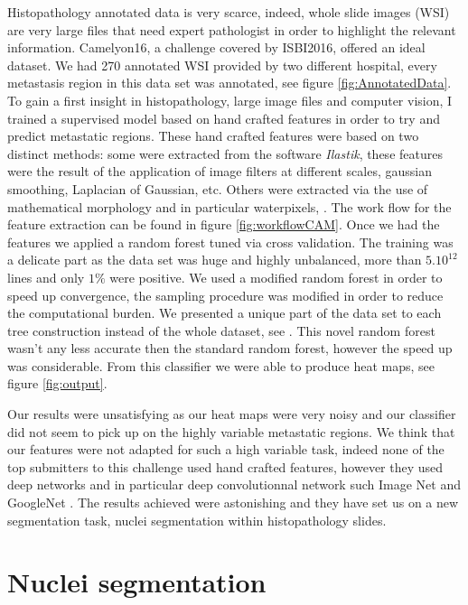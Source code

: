 \documentclass[a4paper,10pt,twocolumn]{article}
\begin{document}
Histopathology annotated data is very scarce, indeed, whole slide images (WSI) are very large files that need expert pathologist in order to highlight the relevant information. Camelyon16, a challenge covered by ISBI2016, offered an ideal dataset. We had 270 annotated WSI provided by two different hospital, every metastasis region in this data set was annotated, see figure \ref{fig:AnnotatedData}. To gain a first insight in histopathology, large image files and computer vision, I trained a supervised model based on hand crafted features in order to try and predict metastatic regions. These hand crafted features were based on two distinct methods: some were extracted from the software \textit{Ilastik}, these features were the result of the application of image filters at different scales, gaussian smoothing, Laplacian of Gaussian, etc. Others were extracted via the use of mathematical morphology and in particular  waterpixels, \citep{waterpixels}. The work flow for the feature extraction can be found in figure \ref{fig:workflowCAM}. Once we had the features we applied a random forest tuned via cross validation. The training was a delicate part as the data set was huge and highly unbalanced, more than $5 . 10^{12}$ lines and only $1\%$ were positive. We used a modified random forest in order to speed up convergence, the sampling procedure was modified in order to reduce the computational burden. We presented a unique part of the data set to each tree construction instead of the whole dataset, see \citep{breiman}. This novel random forest wasn't any less accurate then the standard random forest, however the speed up was considerable. From this classifier we were able to produce heat maps, see figure \ref{fig:output}. 

Our results were unsatisfying as our heat maps were very noisy and our classifier did not seem to pick up on the highly variable metastatic regions. We think that our features were not adapted for such a high variable task, indeed none of the top submitters to this challenge used hand crafted features, however they used deep networks and in particular deep convolutionnal network such Image Net \citep{ImageNet} and GoogleNet \citep{szegedy2015going}. The results achieved were astonishing and they have set us on a new segmentation task, nuclei segmentation within histopathology slides.

\section{Nuclei segmentation}
\end{document}
